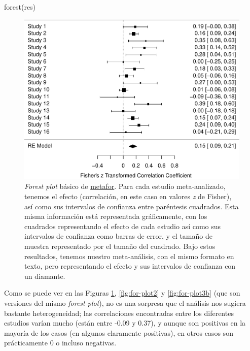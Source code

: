 \documentclass[
  bookmarksnumbered]{article}
\newenvironment{Shaded}{\begin{snugshade}}{\end{snugshade}}
\newcommand{\FunctionTok}[1]{\textcolor[rgb]{0.39,0.29,0.61}{#1}}
\newcommand{\NormalTok}[1]{\textcolor[rgb]{0.12,0.11,0.11}{#1}}
\begin{document}
\begin{Shaded}
\begin{Highlighting}[]
\FunctionTok{forest}\NormalTok{(res)}
\end{Highlighting}
\end{Shaded}

\begin{figure}
\centering
\includegraphics{Meta-analysis_files/figure-latex/for-plot1-1.pdf}
\caption{\label{fig:for-plot1}\emph{Forest plot} básico de \href{https://www.metafor-project.org/doku.php}{metafor}. Para cada estudio meta-analizado, tenemos el efecto (correlación, en este caso en valores \emph{z} de Fisher), así como sus intervalos de confianza entre paréntesis cuadrados. Esta misma información está representada gráficamente, con los cuadrados representando el efecto de cada estudio así como sus intervalos de confianza como barras de error, y el tamaño de muestra representado por el tamaño del cuadrado. Bajo estos resultados, tenemos nuestro meta-análisis, con el mismo formato en texto, pero representando el efecto y sus intervalos de confianza con un diamante.}
\end{figure}

Como se puede ver en las Figuras \ref{fig:for-plot1}, \ref{fig:for-plot2} y \ref{fig:for-plot3b} (que son versiones del mismo \emph{forest plot}), no es una sorpresa que el análisis nos sugiera bastante heterogeneidad; las correlaciones encontradas entre los diferentes estudios varían mucho (están entre -0.09 y 0.37), y aunque son positivas en la mayoría de los casos (en algunos claramente positivas), en otros casos son prácticamente 0 o incluso negativas.
\end{document}
